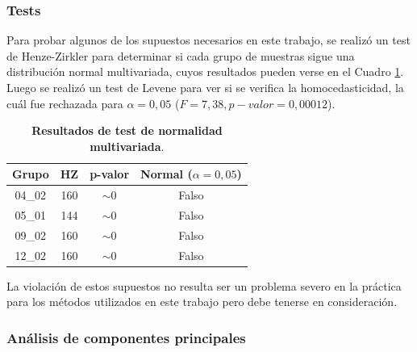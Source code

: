 \documentclass[12pt]{article}
\begin{document}
\subsubsection{Tests}

Para probar algunos de los supuestos necesarios en este trabajo, se realizó un test de Henze-Zirkler para determinar si cada grupo de muestras sigue una distribución normal multivariada, cuyos resultados pueden verse en el Cuadro \ref{table:normality}. Luego se realizó un test de Levene para ver si se verifica la homocedasticidad, la cuál fue rechazada para $\alpha = 0,05$ ($F = 7,38, p-valor = 0,00012$).




\begin{table}[htbp]
\centering
\begin{tabular}{|c|c|c|c|}
\hline
Grupo                        & HZ & p-valor & Normal ($\alpha = 0,05$) \\ \hline
04\_02                       & 160 & $\sim$0 & Falso      \\ \hline
05\_01                       & 144 & $\sim$0 & Falso       \\ \hline
09\_02                       & 160 & $\sim$0 & Falso      \\ \hline
12\_02                       & 160 & $\sim$0 & Falso       \\ \hline
\end{tabular}
\caption{\textbf{Resultados de test de normalidad multivariada}.}
\label{table:normality}
\end{table}

La violación de estos supuestos no resulta ser un problema severo en la práctica para los métodos utilizados en este trabajo pero debe tenerse en consideración.

\subsubsection{Análisis de componentes principales}
\end{document}
